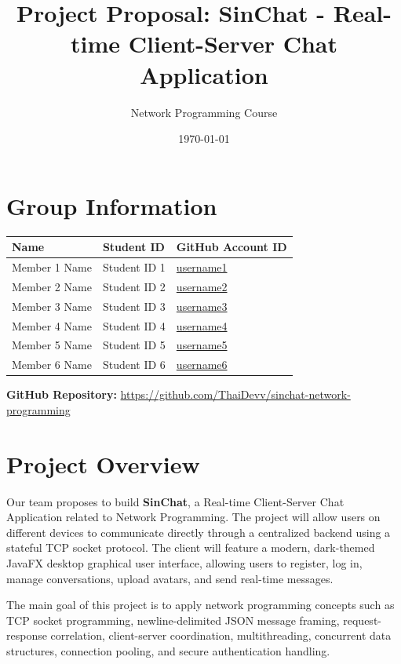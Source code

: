 \documentclass[11pt]{article}
\title{Project Proposal: SinChat - Real-time Client-Server Chat Application}
\author{Network Programming Course}
\date{\today}
\begin{document}
\maketitle

\section{Group Information}

\begin{longtable}{>{\raggedright\arraybackslash}p{} >{\raggedright\arraybackslash}p{} >{\raggedright\arraybackslash}p{}}
\toprule
\textbf{Name} & \textbf{Student ID} & \textbf{GitHub Account ID} \\
\midrule
Member 1 Name & Student ID 1 & \href{https://github.com/username1}{username1} \\
Member 2 Name & Student ID 2 & \href{https://github.com/username2}{username2} \\
Member 3 Name & Student ID 3 & \href{https://github.com/username3}{username3} \\
Member 4 Name & Student ID 4 & \href{https://github.com/username4}{username4} \\
Member 5 Name & Student ID 5 & \href{https://github.com/username5}{username5} \\
Member 6 Name & Student ID 6 & \href{https://github.com/username6}{username6} \\
\bottomrule
\end{longtable}

\textbf{GitHub Repository:} \url{https://github.com/ThaiDevv/sinchat-network-programming}

\section{Project Overview}

Our team proposes to build \textbf{SinChat}, a Real-time Client-Server Chat Application related to Network Programming. The project will allow users on different devices to communicate directly through a centralized backend using a stateful TCP socket protocol. The client will feature a modern, dark-themed JavaFX desktop graphical user interface, allowing users to register, log in, manage conversations, upload avatars, and send real-time messages.

The main goal of this project is to apply network programming concepts such as TCP socket programming, newline-delimited JSON message framing, request-response correlation, client-server coordination, multithreading, concurrent data structures, connection pooling, and secure authentication handling.
\end{document}
